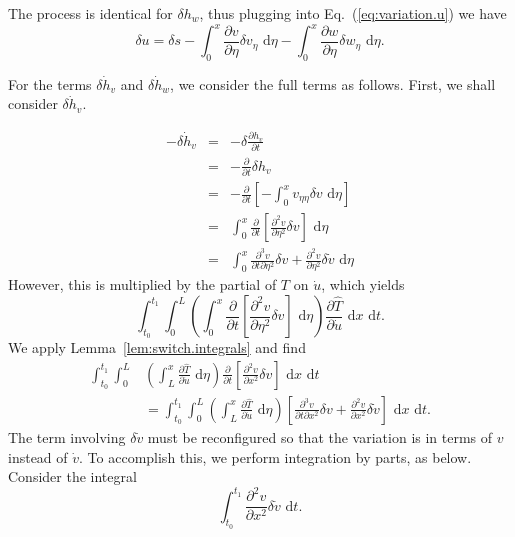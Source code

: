 The process is identical for $\delta h_w$, thus plugging into Eq.~(\ref{eq:variation.u}) we have
\begin{equation}
\delta u = \delta s - \int_0^x \frac{\partial v}{\partial \eta}\delta v_{\eta}\text{ d}\eta - \int_0^x \frac{\partial w}{\partial \eta}\delta w_{\eta}\text{ d}\eta.
\label{eq:variation.u.final}
\end{equation}

For the terms $\delta \dot h_v$ and $\delta \dot h_w$, we consider the full terms as follows. First, we shall consider $\delta\dot h_v$.

\begin{eqnarray}
-\delta\dot h_v &=& -\delta \frac{\partial h_v}{\partial t} \\
 &=& -\frac{\partial}{\partial t}\delta h_v\\
 &=& -\frac{\partial}{\partial t}\left[-\int_0^xv_{\eta\eta}\delta v\text{ d}\eta\right] \\
 &=& \int_0^x\frac{\partial}{\partial t}\left[\frac{\partial^2v}{\partial\eta^2}\delta v\right]\text{ d}\eta\\
 &=& \int_0^x\frac{\partial^3 v}{\partial t\partial\eta^2}\delta v+\frac{\partial^2 v}{\partial \eta^2}\delta\dot v\text{ d}\eta
\end{eqnarray}
However, this is multiplied by the partial of $T$ on $\dot u$, which yields
\begin{equation}
\int_{t_0}^{t_1}\int_0^L\left(\int_0^x\frac{\partial}{\partial t}\left[\frac{\partial^2v}{\partial\eta^2}\delta v\right]\text{ d}\eta\right)\frac{\partial \hat T}{\partial \dot u}\text{ d}x\text{ d}t.
\end{equation}
We apply Lemma~\ref{lem:switch.integrals} and find
\begin{align}
 \int_{t_0}^{t_1} \int_0^L & \left(\int_L^x\frac{\partial\hat T}{\partial \dot u}\text{ d}\eta\right)\frac{\partial}{\partial t}\left[\frac{\partial^2v}{\partial x^2}\delta v\right]\text{ d}x\text{ d}t \label{eq:lemma_switch_vdot}\\
&= \int_{t_0}^{t_1}\int_0^L\left(\int_L^x\frac{\partial\hat T}{\partial \dot u}\text{ d}\eta\right)\left[\frac{\partial^3v}{\partial t\partial x^2}\delta v+\frac{\partial^2 v}{\partial x^2}\delta\dot v\right]\text{ d}x\text{ d}t. \nonumber
\end{align}
The term involving $\delta \dot v$ must be reconfigured so that the variation is in terms of $v$ instead of $\dot v$. To accomplish this, we perform integration by parts, as below.
Consider the integral
\begin{equation}
\int_{t_0}^{t_1}\frac{\partial^2 v}{\partial x^2}\delta \dot v\text{ d}t.
\end{equation}
